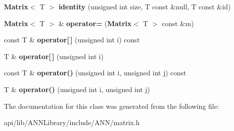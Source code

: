 \begin{DoxyCompactItemize}
\item 
{\bf Matrix}$<$ T $>$ {\bfseries identity} (unsigned int size, T const \&null, T const \&id)\label{class_g_a_n_n_1_1_matrix_ae61ef07a101463ad49ab8f9f7dd4f2fe}

\item 
{\bf Matrix}$<$ T $>$ \& {\bfseries operator=} ({\bf Matrix}$<$ T $>$ const \&m)\label{class_g_a_n_n_1_1_matrix_a0aa93d1a66567637deb98c943f936fd4}

\item 
const T \& {\bfseries operator[$\,$]} (unsigned int i) const \label{class_g_a_n_n_1_1_matrix_add9f200cb6a2e53709090621e3a1150a}

\item 
T \& {\bfseries operator[$\,$]} (unsigned int i)\label{class_g_a_n_n_1_1_matrix_a700ad2c1e9ab4fd76fe1cb18092a80f1}

\item 
const T \& {\bfseries operator()} (unsigned int i, unsigned int j) const \label{class_g_a_n_n_1_1_matrix_aa3bef5292a718f45e094926602ff65ca}

\item 
T \& {\bfseries operator()} (unsigned int i, unsigned int j)\label{class_g_a_n_n_1_1_matrix_ac3f7f2d7467ba5bc95fca1890be74a38}

\end{DoxyCompactItemize}


The documentation for this class was generated from the following file\+:\begin{DoxyCompactItemize}
\item 
api/lib/\+A\+N\+N\+Library/include/\+A\+N\+N/matrix.\+h\end{DoxyCompactItemize}
